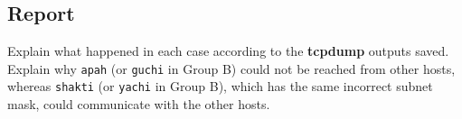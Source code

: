 \documentclass{../UTNetLab}
\begin{document}
    \subsection*{Report}
    Explain what happened in each case according to the \textbf{tcpdump} outputs saved.
    Explain why \texttt{apah} (or \texttt{guchi} in Group B) could not be reached from other hosts, whereas \texttt{shakti} (or \texttt{yachi} in Group B), which has the same incorrect subnet mask, could communicate with the other hosts.
\end{document}
